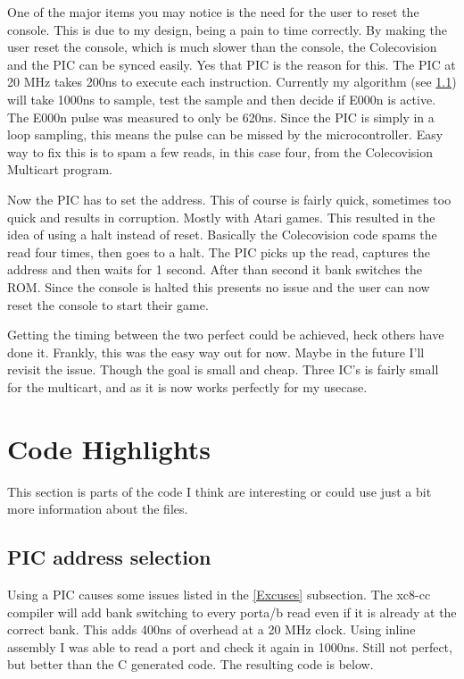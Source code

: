 \documentclass{article}
\begin{document}
  \par
  One of the major items you may notice is the need for the user to reset the console. This is due to my design, being a pain to time correctly.
  By making the user reset the console, which is much slower than the console, the Colecovision and the PIC can be synced easily. Yes that PIC is the reason for this.
  The PIC at 20 MHz takes 200ns to execute each instruction. Currently my algorithm (see \ref{PIC address selection}) will take 1000ns to sample, test the sample and then
  decide if E000n is active. The E000n pulse was measured to only be 620ns. Since the PIC is simply in a loop sampling, this means the pulse can be missed by the
  microcontroller. Easy way to fix this is to spam a few reads, in this case four, from the Colecovision Multicart program.
  \par
  Now the PIC has to set the address. This of course is fairly quick, sometimes too quick and results in corruption. Mostly with Atari games. This resulted in the idea
  of using a halt instead of reset. Basically the Colecovision code spams the read four times, then goes to a halt. The PIC picks up the read, captures the address and
  then waits for 1 second. After than second it bank switches the ROM. Since the console is halted this presents no issue and the user can now reset the console to
  start their game.
  \par
  Getting the timing between the two perfect could be achieved, heck others have done it. Frankly, this was the easy way out for now. Maybe in the future I'll revisit the issue.
  Though the goal is small and cheap. Three IC's is fairly small for the multicart, and as it is now works perfectly for my usecase.

  \newpage

  \section{Code Highlights}

  \par
  This section is parts of the code I think are interesting or could use just a bit more information about the files.

  \subsection{PIC address selection} \label{PIC address selection}

  \par
  Using a PIC causes some issues listed in the \ref{Excuses} subsection. The xc8-cc compiler will add bank switching to every porta/b read even if
  it is already at the correct bank. This adds 400ns of overhead at a 20 MHz clock. Using inline assembly I was able to read a port and check it again
  in 1000ns. Still not perfect, but better than the C generated code. The resulting code is below.
\end{document}
